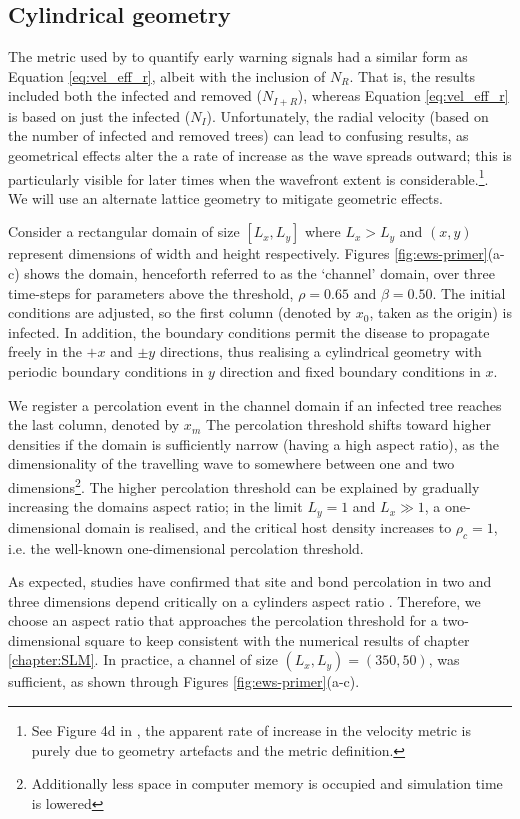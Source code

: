 \subsection{Cylindrical geometry}

The metric used by \cite{OROZCOFUENTES201912} to quantify early warning signals had a similar form as Equation \ref{eq:vel_eff_r}, albeit with the inclusion of $N_R$.
That is, the results included both the infected and removed ($N_{I+R}$), whereas Equation \ref{eq:vel_eff_r} is based on just the infected ($N_I$). 
Unfortunately, the radial velocity (based on the number of infected and removed trees) can lead to confusing results, as geometrical effects alter the a rate of increase as the wave spreads outward; this is particularly visible for later times when the wavefront extent is considerable.\footnote{See Figure 4d in \cite{OROZCOFUENTES201912}, the apparent rate of increase in the velocity metric is purely due to geometry artefacts and the metric definition.}.
We will use an alternate lattice geometry to mitigate geometric effects.

Consider a rectangular domain of size $[L_x, L_y]$ where $L_x>L_y$ and $(x, y)$ represent dimensions of width and height respectively.
Figures \ref{fig:ews-primer}(a-c) shows the domain, henceforth referred to as the `channel' domain, over three time-steps for parameters above the threshold, $\rho=0.65$ and $\beta=0.50$.
The initial conditions are adjusted, so the first column (denoted by $x_0$, taken as the origin) is infected.
In addition, the boundary conditions permit the disease to propagate freely in the $+x$ and $\pm y$ directions, thus realising a cylindrical geometry with periodic boundary conditions in $y$ direction and fixed boundary conditions in $x$.

We register a percolation event in the channel domain if an infected tree reaches the last column, denoted by $x_m$
The percolation threshold shifts toward higher densities if the domain is sufficiently narrow (having a high aspect ratio), as the dimensionality of the travelling wave to somewhere between one and two dimensions\footnote{Additionally less space in computer memory is occupied and simulation time is lowered}. 
The higher percolation threshold can be explained by gradually increasing the domains aspect ratio;
in the limit $L_y = 1$ and $L_x  \gg 1$, a one-dimensional domain is realised, and the critical host density increases to $\rho_c=1$, i.e. the well-known one-dimensional percolation threshold.

As expected, studies have confirmed that site and bond percolation in two and three dimensions depend critically on a cylinders aspect ratio \cite{sangare2009continuum}.
Therefore, we choose an aspect ratio that approaches the percolation threshold for a two-dimensional square to keep consistent with the numerical results of chapter \ref{chapter:SLM}. 
In practice, a channel of size $(L_x, L_y) = (350, 50)$, was sufficient, as shown through Figures \ref{fig:ews-primer}(a-c). 

